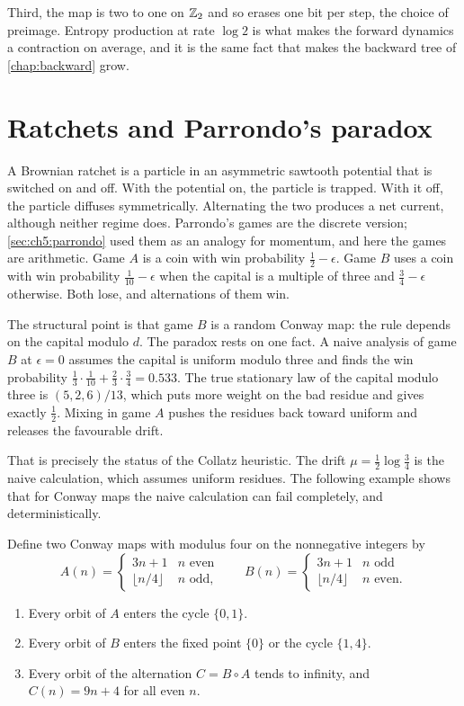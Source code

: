 Third, the map is two to one on $\mathbb{Z}_2$ and so erases one bit per step, the choice of preimage. Entropy production at rate $\log 2$ is what makes the forward dynamics a contraction on average, and it is the same fact that makes the backward tree of \cref{chap:backward} grow.

\section{Ratchets and Parrondo's paradox}\label{rrt:sec:ratchet}

A Brownian ratchet \cite{ajdari1992} is a particle in an asymmetric sawtooth potential that is switched on and off. With the potential on, the particle is trapped. With it off, the particle diffuses symmetrically. Alternating the two produces a net current, although neither regime does. Parrondo's games \cite{harmer1999} are the discrete version; \cref{sec:ch5:parrondo} used them as an analogy for momentum, and here the games are arithmetic. Game $A$ is a coin with win probability $\tfrac12-\epsilon$. Game $B$ uses a coin with win probability $\tfrac1{10}-\epsilon$ when the capital is a multiple of three and $\tfrac34-\epsilon$ otherwise. Both lose, and alternations of them win.

The structural point is that game $B$ is a random Conway map: the rule depends on the capital modulo $d$. The paradox rests on one fact. A naive analysis of game $B$ at $\epsilon=0$ assumes the capital is uniform modulo three and finds the win probability $\tfrac13\cdot\tfrac1{10}+\tfrac23\cdot\tfrac34=0.533$. The true stationary law of the capital modulo three is $(5,2,6)/13$, which puts more weight on the bad residue and gives exactly $\tfrac12$. Mixing in game $A$ pushes the residues back toward uniform and releases the favourable drift.

That is precisely the status of the Collatz heuristic. The drift $\mu=\tfrac12\log\tfrac34$ is the naive calculation, which assumes uniform residues. The following example shows that for Conway maps the naive calculation can fail completely, and deterministically.

\begin{theorem}\label{rrt:thm:parrondo}
Define two Conway maps with modulus four on the nonnegative integers by
\[
A(n)=\begin{cases}3n+1 & n \text{ even}\\ \lfloor n/4\rfloor & n \text{ odd,}\end{cases}
\qquad
B(n)=\begin{cases}3n+1 & n \text{ odd}\\ \lfloor n/4\rfloor & n \text{ even.}\end{cases}
\]
\begin{enumerate}
\item[(a)] Every orbit of $A$ enters the cycle $\{0,1\}$.
\item[(b)] Every orbit of $B$ enters the fixed point $\{0\}$ or the cycle $\{1,4\}$.
\item[(c)] Every orbit of the alternation $C=B\circ A$ tends to infinity, and $C(n)=9n+4$ for all even $n$.
\end{enumerate}
\end{theorem}


